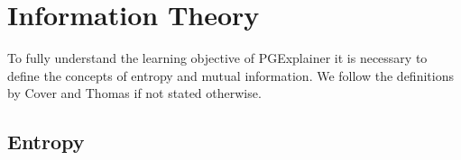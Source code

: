 
\section{Information Theory}
\label{sec:information_theory}
To fully understand the learning objective of PGExplainer it is necessary to define the concepts of entropy and mutual information. We follow the definitions by Cover and Thomas \cite{Cover2005} if not stated otherwise.

\subsection{Entropy}

